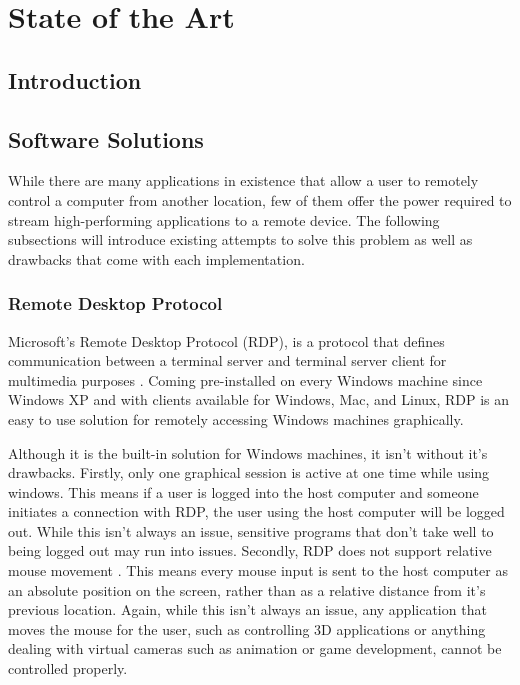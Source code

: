 \chapter{State of the Art} %

\label{Chapter3} %


\section{Introduction}\label{sec:Introduction}

\todosection

\section{Software Solutions}\label{sec:SoftwareSolutions}

While there are many applications in existence that allow a user to remotely control a computer from another location, few of them offer the power required to stream high-performing applications to a remote device.
The following subsections will introduce existing attempts to solve this problem as well as drawbacks that come with each implementation.


\subsection{Remote Desktop Protocol}\label{subsec:RemoteDesktopProtocol}

Microsoft's Remote Desktop Protocol (RDP), is a protocol that defines communication between a terminal server and terminal server client for multimedia purposes \cite{rdpDocs}.
Coming pre-installed on every Windows machine since Windows XP and with clients available for Windows, Mac, and Linux, RDP is an easy to use solution for remotely accessing Windows machines graphically. 

Although it is the built-in solution for Windows machines, it isn't without it's drawbacks.
Firstly, only one graphical session is active at one time while using windows.
This means if a user is logged into the host computer and someone initiates a connection with RDP, the user using the host computer will be logged out.
While this isn't always an issue, sensitive programs that don't take well to being logged out may run into issues.
Secondly, RDP does not support relative mouse movement \cite{burgin_2013}.
This means every mouse input is sent to the host computer as an absolute position on the screen, rather than as a relative distance from it's previous location.
Again, while this isn't always an issue, any application that moves the mouse for the user, such as controlling 3D applications or anything dealing with virtual cameras such as animation or game development, cannot be controlled properly.


